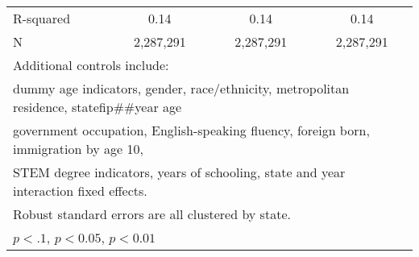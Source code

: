 \begin{table}[htbp]
\begin{tabular}{l*{3}{c}}
R-squared           &        0.14         &        0.14         &        0.14         \\
N                   &   2,287,291         &   2,287,291         &   2,287,291         \\
\bottomrule
\multicolumn{4}{l}{\footnotesize Additional controls include:}\\
\multicolumn{4}{l}{\footnotesize dummy age indicators, gender, race/ethnicity, metropolitan residence, statefip##year age}\\
\multicolumn{4}{l}{\footnotesize government occupation, English-speaking fluency, foreign born, immigration by age 10,}\\
\multicolumn{4}{l}{\footnotesize STEM degree indicators, years of schooling, state and year interaction fixed effects.}\\
\multicolumn{4}{l}{\footnotesize Robust standard errors are all clustered by state.}\\
\multicolumn{4}{l}{\footnotesize \sym{*} \(p<.1\), \sym{**} \(p<0.05\), \sym{***} \(p<0.01\)}\\
\end{tabular}
\end{table}
